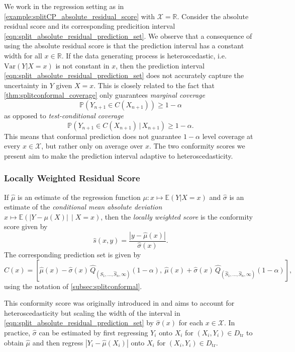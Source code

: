\documentclass[11pt, titlepage]{article} %
\newcommand{\R}{\mathrm}
\newcommand{\Prob}[1]{\mathbb{P}\left( #1 \right)}
\newcommand{\Exp}[3]{\mathbb{E}\left#2 #1 \right#3}
\numberwithin{equation}{section}
\theoremstyle{definition}
\numberwithin{theorem}{section}
\numberwithin{lemma}{section}
\numberwithin{corollary}{section}
\numberwithin{proposition}{section}
\numberwithin{definition}{section}
\numberwithin{remark}{section}
\begin{document}
We work in the regression setting as in \cref{example:splitCP_absolute_residual_score} with \(\mathcal{X} = \mathbb{R}\). Consider the absolute residual score and its corresponding predicition interval \eqref{eqn:split_absolute_residual_prediction_set}. We observe that a consequence of using the absolute residual score is that the prediction interval has a constant width for all \(x \in \mathbb{R}.\) If the data generating process is heteroscedastic, i.e. \(\R{Var}(Y | X = x)\) is not constant in \(x\), then the prediction interval \eqref{eqn:split_absolute_residual_prediction_set} does not accurately capture the uncertainty in \(Y\) given \(X = x\). This is closely related to the fact that \cref{thm:splitconformal_coverage} only guarantees \textit{marginal coverage} \[\Prob{Y_{n+1} \in C(X_{n+1}) } \geq 1-\alpha\] as opposed to \textit{test-conditional coverage} \[\Prob{Y_{n+1} \in C(X_{n+1}) \, | \, X_{n+1} } \geq 1-\alpha.\] This means that conformal prediction does not guarantee \(1-\alpha\) level coverage at every \(x \in \mathcal{X}\), but rather only on average over \(x\). The two conformity scores we present aim to make the prediction interval adaptive to heteroscedasticity. 

\subsubsection{Locally Weighted Residual Score}

If \(\hat{\mu}\) is an estimate of the regression function \(\mu:x \mapsto \Exp{Y | X = x}{(}{)}\) and \(\hat{\sigma}\) is an estimate of the \textit{conditional mean absolute deviation} \(x \mapsto \Exp{|Y-\mu(X)| \, \mid X = x}{(}{)}\), then the \textit{locally weighted score} is the conformity score given by \begin{equation}
    \hat{s}(x,y) = \frac{| y - \hat{\mu}(x)|}{\hat{\sigma}(x)}.
\end{equation} The corresponding prediction set is given by \begin{equation}
    C(x) = \left[ \hat{\mu}(x) - \hat{\sigma}(x) \, \hat{Q}_{(\hat{S}_1, \ldots, \hat{S}_n, \infty)}(1-\alpha), \ \hat{\mu}(x) + \hat{\sigma}(x) \, \hat{Q}_{(\hat{S}_1, \ldots, \hat{S}_n, \infty)}(1-\alpha) \right],
\end{equation} using the notation of \cref{subsec:splitconformal}. \vskip5pt

\noindent
This conformity score was originally introduced in \cite{lei2018} and aims to account for heteroscedasticity but scaling the width of the interval in \eqref{eqn:split_absolute_residual_prediction_set} by \(\hat{\sigma}(x)\) for each \(x \in \mathcal{X}\). In practice, \(\hat{\sigma}\) can be estimated by first regressing \(Y_i\) onto \(X_i\) for \((X_i, Y_i) \in D_\R{tr}\) to obtain \(\hat{\mu}\) and then regress \(|Y_i -\hat{\mu}(X_i)|\) onto \(X_i\) for \((X_i, Y_i) \in D_\R{tr}\).
\end{document}
